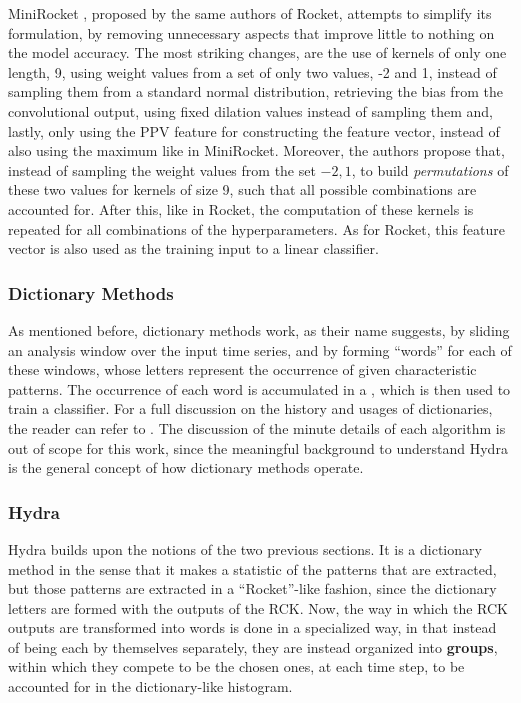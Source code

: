 MiniRocket \cite{Dempster2021MR}, proposed by the same authors of Rocket, attempts to simplify its formulation, by removing unnecessary aspects that improve little to nothing on the model accuracy. 
The most striking changes, are the use of kernels of only one length, 9, using weight values from a set of only two values, -2 and 1, instead of sampling them from a standard normal distribution, retrieving the bias from the convolutional output, using fixed dilation values instead of sampling them and, lastly, only using the PPV feature for constructing the feature vector, instead of also using the maximum like in MiniRocket.
Moreover, the authors propose that, instead of sampling the weight values from the set ${-2, 1}$, to build \emph{permutations} of these two values for kernels of size 9, such that all possible combinations are accounted for. 
After this, like in Rocket, the computation of these kernels is repeated for all combinations of the hyperparameters. As for Rocket, this feature vector is also used as the training input to a linear classifier.

\subsubsection{Dictionary Methods}
As mentioned before, dictionary methods work, as their name suggests, by sliding an analysis window over the input time series, and by forming ``words'' for each of these windows, whose letters represent the occurrence of given characteristic patterns.
The occurrence of each word is accumulated in a , which is then used to train a classifier. 
For a full discussion on the history and usages of dictionaries, the reader can refer to \cite{Dempster2020}. 
The discussion of the minute details of each algorithm is out of scope for this work, since the meaningful background to understand Hydra is the general concept of how dictionary methods operate.

\subsubsection{Hydra}
Hydra builds upon the notions of the two previous sections. It is a dictionary method in the sense that it makes a statistic of the patterns that are extracted, but those patterns are extracted in a ``Rocket''-like fashion, since the dictionary letters are formed with the outputs of the RCK.
Now, the way in which the RCK outputs are transformed into words is done in a specialized way, in that instead of being each by themselves separately, they are instead organized into \textbf{groups}, within which they compete to be the chosen ones, at each time step, to be accounted for in the dictionary-like histogram.


